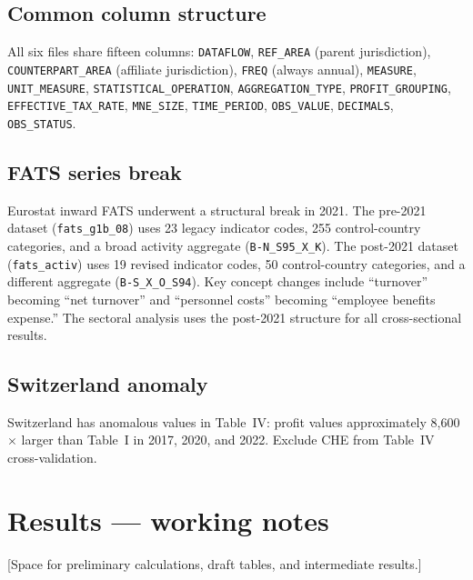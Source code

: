\documentclass[11pt,a4paper]{article}
\newcommand{\code}[1]{\texttt{#1}}
\begin{document}
\subsection{Common column structure}

All six files share fifteen columns: \code{DATAFLOW}, \code{REF\_AREA} (parent jurisdiction), \code{COUNTERPART\_AREA} (affiliate jurisdiction), \code{FREQ} (always annual), \code{MEASURE}, \code{UNIT\_MEASURE}, \code{STATISTICAL\_OPERATION}, \code{AGGREGATION\_TYPE}, \code{PROFIT\_GROUPING}, \code{EFFECTIVE\_TAX\_RATE}, \code{MNE\_SIZE}, \code{TIME\_PERIOD}, \code{OBS\_VALUE}, \code{DECIMALS}, \code{OBS\_STATUS}.

\subsection{FATS series break}

Eurostat inward FATS underwent a structural break in 2021. The pre-2021 dataset (\code{fats\_g1b\_08}) uses 23 legacy indicator codes, 255 control-country categories, and a broad activity aggregate (\code{B-N\_S95\_X\_K}). The post-2021 dataset (\code{fats\_activ}) uses 19 revised indicator codes, 50 control-country categories, and a different aggregate (\code{B-S\_X\_O\_S94}). Key concept changes include ``turnover'' becoming ``net turnover'' and ``personnel costs'' becoming ``employee benefits expense.'' The sectoral analysis uses the post-2021 structure for all cross-sectional results.

\subsection{Switzerland anomaly}

Switzerland has anomalous values in Table~IV: profit values approximately 8,600$\times$ larger than Table~I in 2017, 2020, and 2022. Exclude CHE from Table~IV cross-validation.

\section{Results --- working notes}\label{w:results}

[Space for preliminary calculations, draft tables, and intermediate results.]

\end{document}
